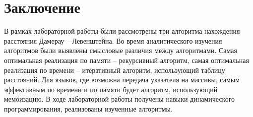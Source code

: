 \chapter*{Заключение}

В рамках лабораторной работы были рассмотрены три алгоритма нахождения  расстояния Дамерау \,--\,Левенштейна. Во время аналитического изучения алгоритмов были выявлены смысловые различия между алгоритмами.
Самая оптимальная реализация по памяти -- рекурсивный алгоритм, самая оптимальная реализация по времени -- итеративный алгоритм, использующий таблицу расстояний. Для языков, где возможна передача указателя на массивы, самым эффективным по времени и по памяти будет алгоритм, использующий мемоизацию. 
В ходе лабораторной работы получены навыки динамического программирования, реализованы изученные алгоритмы.